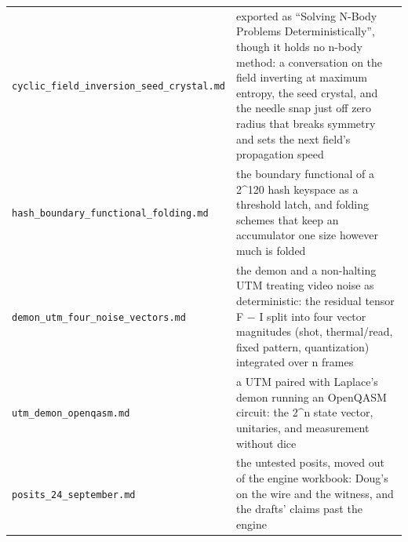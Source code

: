 {\begin{longtable}{>{\RaggedRight\arraybackslash}p{}>{\RaggedRight\arraybackslash}p{}}
\texttt{cyclic\_\allowbreak{}field\_\allowbreak{}inversion\_\allowbreak{}seed\_\allowbreak{}crystal.\allowbreak{}md} & exported as “Solving N-Body Problems Deterministically”, though it holds no n-body method: a conversation on the field inverting at maximum entropy, the seed crystal, and the needle snap just off zero radius that breaks symmetry and sets the next field's propagation speed \\
\texttt{hash\_\allowbreak{}boundary\_\allowbreak{}functional\_\allowbreak{}folding.\allowbreak{}md} & the boundary functional of a 2\textasciicircum{}120 hash keyspace as a threshold latch, and folding schemes that keep an accumulator one size however much is folded \\
\texttt{demon\_\allowbreak{}utm\_\allowbreak{}four\_\allowbreak{}noise\_\allowbreak{}vectors.\allowbreak{}md} & the demon and a non-halting UTM treating video noise as deterministic: the residual tensor F − I split into four vector magnitudes (shot, thermal/read, fixed pattern, quantization) integrated over n frames \\
\texttt{utm\_\allowbreak{}demon\_\allowbreak{}openqasm.\allowbreak{}md} & a UTM paired with Laplace's demon running an OpenQASM circuit: the 2\textasciicircum{}n state vector, unitaries, and measurement without dice \\
\texttt{posits\_\allowbreak{}24\_\allowbreak{}september.\allowbreak{}md} & the untested posits, moved out of the engine workbook: Doug's on the wire and the witness, and the drafts' claims past the engine \\
\bottomrule
\end{longtable}
}
